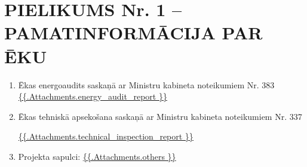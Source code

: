 \section{PIELIKUMS Nr. 1 – PAMATINFORMĀCIJA PAR ĒKU}

\begin{enumerate}[label=\arabic*.]
	\item Ēkas energoaudits saskaņā ar Ministru kabineta noteikumiem Nr. 383
\url{ {{.Attachments.energy_audit_report }} }

\iffalse attachment value="energy audit report" \fi

	\item Ēkas tehniskā apsekošana saskaņā ar Ministru kabineta noteikumiem Nr. 337

\url{ {{.Attachments.technical_inspection_report }} }

\iffalse attachment value="technical inspection report" \fi

	\item Projekta sapulci:
          \url{ {{.Attachments.others }} }
          \iffalse attachment value="others" \fi


\end{enumerate}
